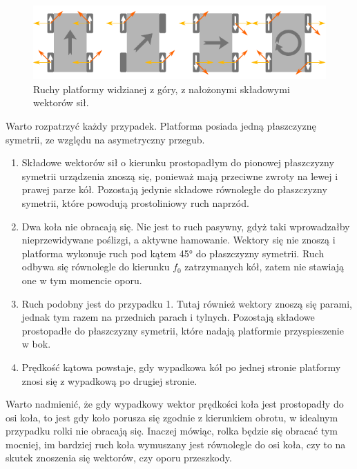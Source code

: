 		\begin{figure}[H]
		\centering
		\includegraphics[width=\textwidth]{graphics/mecanum_dirs_vect.pdf}
		\caption{Ruchy platformy widzianej z góry, z nałożonymi składowymi wektorów sił.}
		\label{fig:mecanum_dirs_vect}
		\end{figure} 

		Warto rozpatrzyć każdy przypadek. Platforma posiada jedną płaszczyznę symetrii, ze względu na asymetryczny przegub.
		\begin{enumerate}
			\item Składowe wektorów sił o kierunku prostopadłym do pionowej płaszczyzny symetrii urządzenia znoszą się, ponieważ mają przeciwne zwroty na lewej i prawej parze kół.
			Pozostają jedynie składowe równoległe do płaszczyzny symetrii, które powodują prostoliniowy ruch naprzód.
			\item Dwa koła nie obracają się. Nie jest to ruch pasywny, gdyż taki wprowadzałby nieprzewidywane poślizgi, a aktywne hamowanie.
			Wektory się nie znoszą i platforma wykonuje ruch pod kątem 45° do płaszczyzny symetrii. Ruch odbywa się równolegle do kierunku $f_0$ zatrzymanych kół,
			zatem nie stawiają one w tym momencie oporu.
			\item Ruch podobny jest do przypadku 1. Tutaj również wektory znoszą się parami, jednak tym razem na przednich parach i tylnych. 
			Pozostają składowe prostopadłe do płaszczyzny symetrii, które nadają platformie przyspieszenie w bok.
			\item Prędkość kątowa powstaje, gdy wypadkowa kół po jednej stronie platformy znosi się z wypadkową po drugiej stronie.
		\end{enumerate}

		Warto nadmienić, że gdy wypadkowy wektor prędkości koła jest prostopadły do osi koła, to jest gdy
		koło porusza się zgodnie z kierunkiem obrotu, w idealnym przypadku rolki nie obracają się.
		Inaczej mówiąc, rolka będzie się obracać tym mocniej, im bardziej ruch koła wymuszany jest równolegle do osi koła, 
		czy to na skutek znoszenia się wektorów, czy oporu przeszkody.
		
